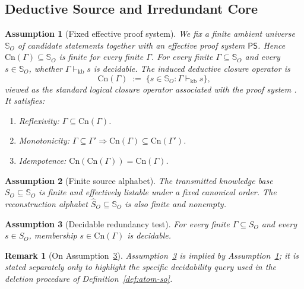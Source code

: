 \documentclass[journal,onecolumn]{IEEEtran}
\newcommand{\Cn}{\text{Cn}}
\newtheorem{assumption}{Assumption}[section]
\newtheorem{remark}{Remark}[section]
\numberwithin{equation}{section}
\begin{document}
\subsection{Deductive Source and Irredundant Core}
\label{subsec:deductive-source-model}

\begin{assumption}[Fixed effective proof system]
\label{assump:proof-system}
We fix a finite ambient universe \(\mathbb{S}_O\) of candidate
statements together with an effective proof system
\(\mathsf{PS}\).
Hence \(\Cn(\Gamma)\subseteq \mathbb{S}_O\) is finite for every finite \(\Gamma\).
For every finite \(\Gamma\subseteq\mathbb{S}_O\) and
every \(s\in\mathbb{S}_O\), whether
\(\Gamma\vdash_{\mathrm{kb}} s\) is decidable.
The induced deductive closure operator is
\[
  \Cn(\Gamma)
  \;:=\;
  \{s\in\mathbb{S}_O:\Gamma\vdash_{\mathrm{kb}} s\},
\]
viewed as the standard logical closure operator associated with the
proof system
\cite{hodges1993model}.
It satisfies:
\begin{enumerate}[label=\textup{(Cn\arabic*)}]
  \item \emph{Reflexivity:} \(\Gamma\subseteq\Cn(\Gamma)\).
  \item \emph{Monotonicity:}
        \(\Gamma\subseteq\Gamma' \Rightarrow
        \Cn(\Gamma)\subseteq\Cn(\Gamma')\).
  \item \emph{Idempotence:}
        \(\Cn(\Cn(\Gamma))=\Cn(\Gamma)\).
\end{enumerate}
\end{assumption}

\begin{assumption}[Finite source alphabet]
\label{assump:finite-so}
The transmitted knowledge base \(S_O\subseteq\mathbb{S}_O\)
is finite and effectively listable under a fixed canonical order.
The reconstruction alphabet \(\hat S_O\subseteq\mathbb{S}_O\)
is also finite and nonempty.
\end{assumption}

\begin{assumption}[Decidable redundancy test]
\label{assump:core-extractable}
For every finite \(\Gamma\subseteq S_O\) and every \(s\in S_O\),
membership \(s\in\Cn(\Gamma)\) is decidable.
\end{assumption}

\begin{remark}[On Assumption~\ref{assump:core-extractable}]
Assumption~\ref{assump:core-extractable} is implied by
Assumption~\ref{assump:proof-system}; it is stated separately only to
highlight the specific decidability query used in the deletion
procedure of Definition~\ref{def:atom-so}.
\end{remark}
\end{document}
